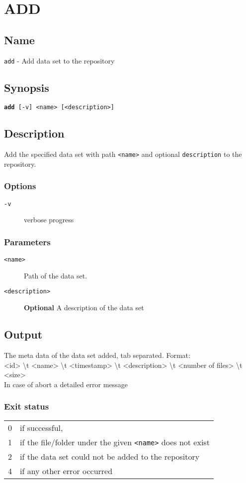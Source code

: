 \documentclass{article} %
\begin{document}
		\section*{ADD}
		\subsection*{Name}
		\texttt{add} - Add data set to the repository
		\subsection*{Synopsis}
		\texttt{\textbf{add} [-v] <name> [<description>]}
		\subsection*{Description}
		Add the specified data set with path \texttt{<name>} and optional \texttt{description} to the repository.\\
		
		\noindent
		\subsubsection*{Options}
		\begin{description}
			\item[\texttt{-v}] verbose progress
		\end{description}
		
		\subsubsection*{Parameters}
		\begin{description}
			\item[\texttt{<name>}] Path of the data set.
			\item[\texttt{<description>}] \textbf{Optional} A description of the data set
		\end{description}
		
		\subsection*{Output}
		The meta data of the data set added, tab separated. Format:\\<id> \textbackslash t <name> \textbackslash t <timestamp> \textbackslash t <description> \textbackslash t <number of files> \textbackslash t <size>\\
		In case of abort a detailed error message
		
		\subsubsection*{Exit status}
		\begin{tabular}{ll}
			0 &  if successful,\\ 
			1 &  if the file/folder under the given \texttt{<name>} does not exist\\ 
			2 &  if the data set could not be added to the repository\\
			4 &  if any other error occurred\\
		\end{tabular}
		
\end{document}

